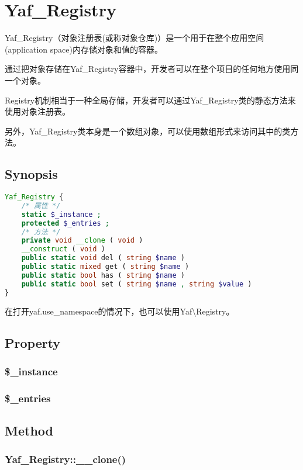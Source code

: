 \chapter{Yaf\_Registry}

Yaf\_Registry（对象注册表(或称对象仓库)）是一个用于在整个应用空间(application space)内存储对象和值的容器。

通过把对象存储在Yaf\_Registry容器中，开发者可以在整个项目的任何地方使用同一个对象。

Registry机制相当于一种全局存储，开发者可以通过Yaf\_Registry类的静态方法来使用对象注册表。

另外，Yaf\_Registry类本身是一个数组对象，可以使用数组形式来访问其中的类方法。


\section{Synopsis}


\begin{lstlisting}[language=PHP]
Yaf_Registry {
    /* 属性 */
    static $_instance ;
    protected $_entries ;
    /* 方法 */
    private void __clone ( void )
    __construct ( void )
    public static void del ( string $name )
    public static mixed get ( string $name )
    public static bool has ( string $name )
    public static bool set ( string $name , string $value )
}
\end{lstlisting}

在打开yaf.use\_namespace的情况下，也可以使用Yaf\textbackslash Registry。

\section{Property}

\subsection{\$\_instance}


\subsection{\$\_entries}


\section{Method}


\subsection{Yaf\_Registry::\_\_clone()}




